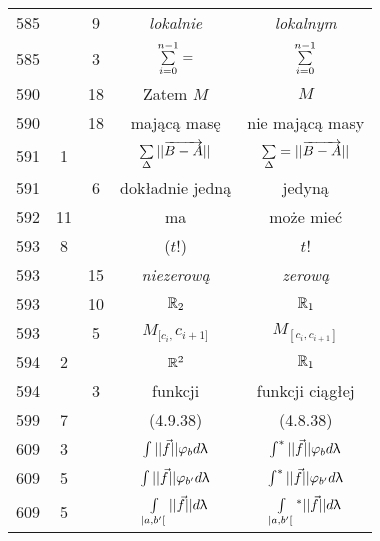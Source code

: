 \documentclass[a4paper,11pt]{article}
\newcommand{\IntL}{\int\limits}
\newcommand{\vp}{\varphi}
\newcommand{\ora}{\overrightarrow}
\begin{document}
\begin{center}
\begin{tabular}{|c|c|c|c|c|}
    585 & &  9 & \emph{lokalnie} & \emph{lokalnym} \\
    585 & &  3 & $\sum\limits_{ i = 0 }^{ n - 1 } =$
           & $\sum\limits_{ i = 0 }^{ n - 1 }$ \\
    590 & & 18 & Zatem $M$ & $M$ \\
    590 & & 18 & mającą masę & nie mającą masy \\
    591 &  1 & & $\Sum_{ \Delta } || \ora{ B - A } ||$
           & $\Sum_{ \Delta } = || \ora{ B - A } ||$ \\
    591 & &  6 & dokładnie jedną & jedyną \\
    592 & 11 & & ma & może mieć \\
    593 &  8 & & ($ t $!) & $ t $! \\
    593 & & 15 & \emph{niezerową} & \emph{zerową} \\
    593 & & 10 & $\mathbb{R}_{ 2 }$ & $\mathbb{R}_{ 1 }$ \\
    593 & & 5 & $M_{ [ c_{ i }, } c_{ i + 1 ] }$
           & $M_{ [ c_{ i }, c_{ i + 1 } ] }$ \\
    594 & 2 & & $\mathbb{R}^{ 2 }$ & $\mathbb{R}_{ 1 }$ \\
    594 & & 3 & funkcji & funkcji ciągłej \\
    599 & 7 & & (4.9.38) & (4.8.38) \\
    609 & 3 & & $\int || \vec{ f } || \vp_{ b } d\la$
           & $\int^{ * } || \vec{ f } || \vp_{ b } d\la$ \\
    609 & 5 & & $\int || \vec{ f } || \vp_{ b' } d\la$
           & $\int^{ * } || \vec{ f } || \vp_{ b' } d\la$ \\
    609 & 5 & & $\IntL_{ | a, b' [ } || \vec{ f } || d\la$
           & $\IntL_{ | a, b' [ }{^{ * }}
             || \vec{ f } || d\la$ \\ \hline
  \end{tabular}


\end{center}
\end{document}
